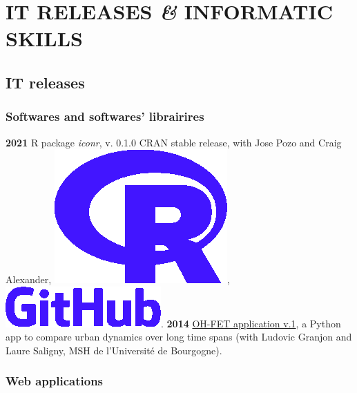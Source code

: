 \documentclass{article}
\begin{document}
\section{IT RELEASES \textit{\&} INFORMATIC SKILLS}

\subsection*{IT releases}

\subsubsection*{Softwares and softwares' librairires}

\textbf{2021 }\textsf{R} package \textit{iconr}, v. 0.1.0 CRAN stable release, with Jose Pozo and Craig Alexander, \href{https://cran.r-project.org/web/packages/iconr/index.html}{\includegraphics[scale=0.04]{prog-r.png}}, \href{https://github.com/zoometh/iconr#readme}{\includegraphics[scale=0.12]{github-rect.png}}.
\smallbreak
\textbf{2014 }\href{https://www.oxbowbooks.com/dbbc/caa2014-21st-century-archaeology.html/}{OH-FET application v.1}, a \textsf{Python} app to compare urban dynamics over long time spans (with Ludovic Granjon and Laure Saligny, MSH de l'Universit\'{e} de Bourgogne).

\subsubsection*{Web applications}
\end{document}

